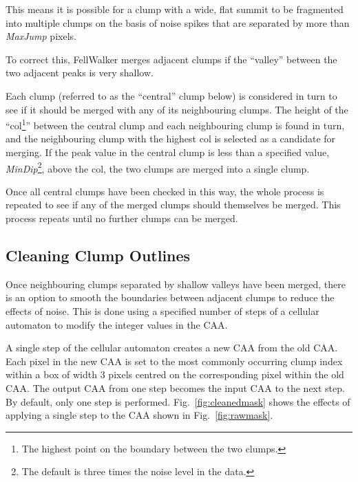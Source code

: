 \documentclass[final,authoryear,5p,times,twocolumn]{elsarticle}
\begin{document}
This means it is possible for a clump with a wide, flat summit to be
fragmented into multiple clumps on the basis of noise spikes that are
separated by more than \emph{MaxJump} pixels.

To correct this, FellWalker merges adjacent clumps if the ``valley''
between the two adjacent peaks is very shallow.

Each clump (referred to as the ``central'' clump below) is considered in
turn to see if it should be merged with any of its neighbouring clumps.
The height of the ``col\footnote{The highest point on the boundary
between the two clumps.}'' between the central clump and each
neighbouring clump is found in turn, and the neighbouring clump with the
highest col is selected as a candidate for merging. If the peak value in
the central clump is less than a specified value,
\emph{MinDip}\footnote{The default is three times the noise level in the
data.}, above the col, the two clumps are merged into a single clump.

Once all central clumps have been checked in this way, the whole process
is repeated to see if any of the merged clumps should themselves be
merged. This process repeats until no further clumps can be merged.

\subsection{Cleaning Clump Outlines}

Once neighbouring clumps separated by shallow valleys have been merged,
there is an option to smooth the boundaries between adjacent clumps to
reduce the effects of noise. This is done using a specified number of
steps of a cellular automaton to modify the integer values in the CAA.

A single step of the cellular automaton creates a new CAA from the old
CAA. Each pixel in the new CAA is set to the most commonly occurring
clump index within a box of width 3 pixels centred on the corresponding
pixel within the old CAA. The output CAA from one step becomes the input
CAA to the next step. By default, only one step is performed.
Fig.~\ref{fig:cleanedmask} shows the effects of applying a single step to
the CAA shown in Fig.~\ref{fig:rawmask}.
\end{document}
